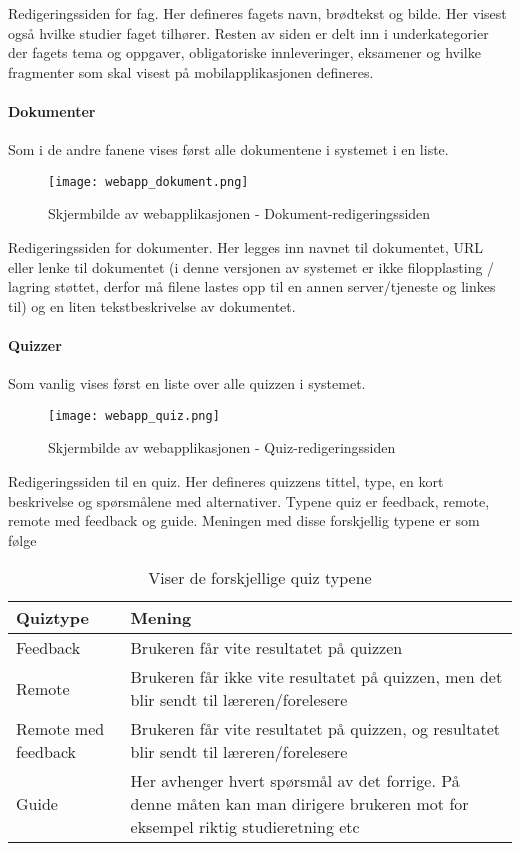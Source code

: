 \documentclass[../main.tex]{subfiles}
\begin{document}
Redigeringssiden for fag. Her defineres fagets navn, brødtekst og bilde. Her visest også hvilke studier faget tilhører. Resten av siden er delt inn i underkategorier der fagets tema og oppgaver, obligatoriske innleveringer, eksamener og hvilke fragmenter som skal visest på mobilapplikasjonen defineres.

\paragraph{Dokumenter}
Som i de andre fanene vises først alle dokumentene i systemet i en liste.

\begin{figure}[H]
  \centering
  \texttt{[image: webapp\_dokument.png]}
  \caption{Skjermbilde av webapplikasjonen - Dokument-redigeringssiden}
\end{figure}

Redigeringssiden for dokumenter. Her legges inn navnet til dokumentet, URL eller lenke til dokumentet (i denne versjonen av systemet er ikke filopplasting / lagring støttet, derfor må filene lastes opp til en annen server/tjeneste og linkes til) og en liten tekstbeskrivelse av dokumentet.

\paragraph{Quizzer}

Som vanlig vises først en liste over alle quizzen i systemet.

\begin{figure}[H]
  \centering
  \texttt{[image: webapp\_quiz.png]}
  \caption{Skjermbilde av webapplikasjonen - Quiz-redigeringssiden}
\end{figure}

Redigeringssiden til en quiz. Her defineres quizzens tittel, type, en kort beskrivelse og spørsmålene med alternativer. Typene quiz er feedback, remote, remote med feedback og guide. Meningen med disse forskjellig typene er som følge

\begin{table}[H]
\begin{center}
\caption{Viser de forskjellige quiz typene}
  \begin{tabular}{ | p{5cm} | p{8cm} |}
    \hline
    Quiztype & Mening \\ \hline
    Feedback & Brukeren får vite resultatet på quizzen \\ \hline
    Remote & Brukeren får ikke vite resultatet på quizzen, men det blir sendt til læreren/forelesere \\ \hline
    Remote med feedback & Brukeren får vite resultatet på quizzen, og resultatet blir sendt til læreren/forelesere \\ \hline
    Guide & Her avhenger hvert spørsmål av det forrige. På denne måten kan man dirigere brukeren mot for eksempel riktig studieretning etc \\
    \hline
  \end{tabular}
\end{center}
\end{table}
\end{document}
